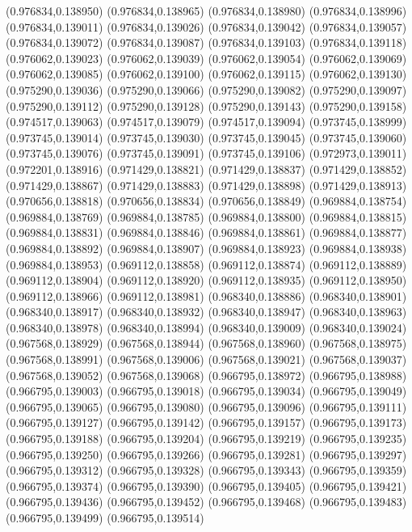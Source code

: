 (0.976834,0.138950)
(0.976834,0.138965)
(0.976834,0.138980)
(0.976834,0.138996)
(0.976834,0.139011)
(0.976834,0.139026)
(0.976834,0.139042)
(0.976834,0.139057)
(0.976834,0.139072)
(0.976834,0.139087)
(0.976834,0.139103)
(0.976834,0.139118)
(0.976062,0.139023)
(0.976062,0.139039)
(0.976062,0.139054)
(0.976062,0.139069)
(0.976062,0.139085)
(0.976062,0.139100)
(0.976062,0.139115)
(0.976062,0.139130)
(0.975290,0.139036)
(0.975290,0.139066)
(0.975290,0.139082)
(0.975290,0.139097)
(0.975290,0.139112)
(0.975290,0.139128)
(0.975290,0.139143)
(0.975290,0.139158)
(0.974517,0.139063)
(0.974517,0.139079)
(0.974517,0.139094)
(0.973745,0.138999)
(0.973745,0.139014)
(0.973745,0.139030)
(0.973745,0.139045)
(0.973745,0.139060)
(0.973745,0.139076)
(0.973745,0.139091)
(0.973745,0.139106)
(0.972973,0.139011)
(0.972201,0.138916)
(0.971429,0.138821)
(0.971429,0.138837)
(0.971429,0.138852)
(0.971429,0.138867)
(0.971429,0.138883)
(0.971429,0.138898)
(0.971429,0.138913)
(0.970656,0.138818)
(0.970656,0.138834)
(0.970656,0.138849)
(0.969884,0.138754)
(0.969884,0.138769)
(0.969884,0.138785)
(0.969884,0.138800)
(0.969884,0.138815)
(0.969884,0.138831)
(0.969884,0.138846)
(0.969884,0.138861)
(0.969884,0.138877)
(0.969884,0.138892)
(0.969884,0.138907)
(0.969884,0.138923)
(0.969884,0.138938)
(0.969884,0.138953)
(0.969112,0.138858)
(0.969112,0.138874)
(0.969112,0.138889)
(0.969112,0.138904)
(0.969112,0.138920)
(0.969112,0.138935)
(0.969112,0.138950)
(0.969112,0.138966)
(0.969112,0.138981)
(0.968340,0.138886)
(0.968340,0.138901)
(0.968340,0.138917)
(0.968340,0.138932)
(0.968340,0.138947)
(0.968340,0.138963)
(0.968340,0.138978)
(0.968340,0.138994)
(0.968340,0.139009)
(0.968340,0.139024)
(0.967568,0.138929)
(0.967568,0.138944)
(0.967568,0.138960)
(0.967568,0.138975)
(0.967568,0.138991)
(0.967568,0.139006)
(0.967568,0.139021)
(0.967568,0.139037)
(0.967568,0.139052)
(0.967568,0.139068)
(0.966795,0.138972)
(0.966795,0.138988)
(0.966795,0.139003)
(0.966795,0.139018)
(0.966795,0.139034)
(0.966795,0.139049)
(0.966795,0.139065)
(0.966795,0.139080)
(0.966795,0.139096)
(0.966795,0.139111)
(0.966795,0.139127)
(0.966795,0.139142)
(0.966795,0.139157)
(0.966795,0.139173)
(0.966795,0.139188)
(0.966795,0.139204)
(0.966795,0.139219)
(0.966795,0.139235)
(0.966795,0.139250)
(0.966795,0.139266)
(0.966795,0.139281)
(0.966795,0.139297)
(0.966795,0.139312)
(0.966795,0.139328)
(0.966795,0.139343)
(0.966795,0.139359)
(0.966795,0.139374)
(0.966795,0.139390)
(0.966795,0.139405)
(0.966795,0.139421)
(0.966795,0.139436)
(0.966795,0.139452)
(0.966795,0.139468)
(0.966795,0.139483)
(0.966795,0.139499)
(0.966795,0.139514)

